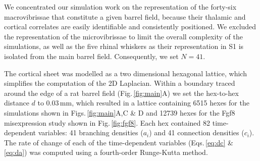 \documentclass[9pt,lineno]{elife}
\newcommand{\MPone}[1]{\textcolor{colmpone}{#1}}
\begin{document}
\MPone{We concentrated our simulation work on the representation of the
  forty-six macrovibrissae that constitute a given barrel field, because their
  thalamic and cortical correlates are easily identifiable and consistently
  positioned. We excluded the representation of the microvibrissae to limit
  the overall complexity of the simulations, as well as the five rhinal
  whiskers as their representation in S1 is isolated from the main barrel
  field. Consequently, we set $N=41$.}

The cortical sheet was modelled as a two dimensional hexagonal lattice, which
simplifies the computation of the 2D Laplacian. Within a boundary traced
around the edge of a
rat barrel field (Fig.\,\ref{fig:main}A) we set the hex-to-hex distance
$d$ to 0.03\,mm, which resulted in a lattice containing 6515 hexes for the
simulations shown in Figs.\,\ref{fig:main}A,C \& D and 12739 hexes for the Fgf8
misexpression study shown in Fig.\,\ref{fig:fgf8}. Each hex contained 82 time-dependent
variables: 41 branching densities ($a_i$) and 41 connection densities ($c_i$).
The rate of change of each of the time-dependent variables (Eqs.\,\ref{eq:dc}
\& \ref{eq:da}) was computed using a fourth-order Runge-Kutta method.
\end{document}
